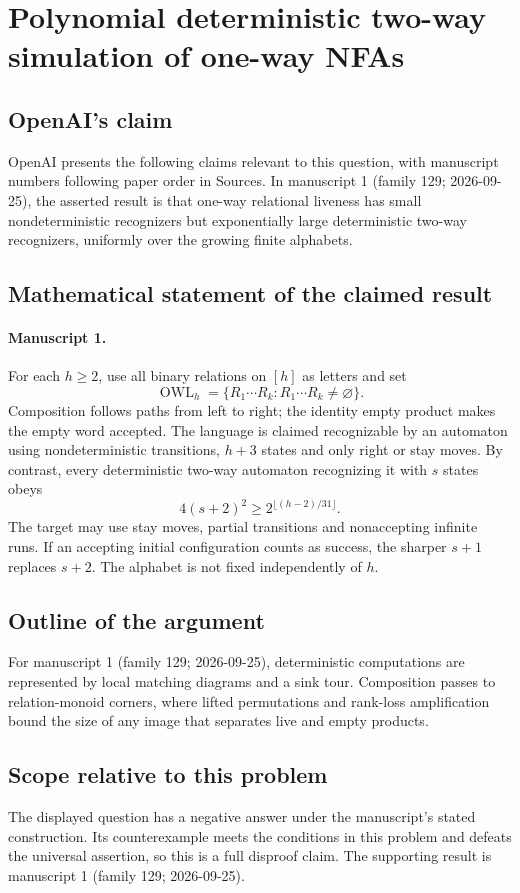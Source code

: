 \documentclass[11pt]{article}
\begin{document}
\section*{Polynomial deterministic two-way simulation of one-way NFAs}

\subsection{OpenAI's claim}
OpenAI presents the following claims relevant to this question, with manuscript numbers following paper order in Sources. In manuscript 1 (family 129; 2026-09-25), the asserted result is that one-way relational liveness has small nondeterministic recognizers but exponentially large deterministic two-way recognizers, uniformly over the growing finite alphabets.

\subsection{Mathematical statement of the claimed result}
\paragraph{Manuscript 1.}
For each $h\ge2$, use all binary relations on $[h]$ as letters and set
\[
 \operatorname{OWL}_h=\{R_1\cdots R_k:R_1\cdots R_k\ne\varnothing\}.
\]
Composition follows paths from left to right; the identity empty product makes the empty word accepted. The language is claimed recognizable by an automaton using nondeterministic transitions, $h+3$ states and only right or stay moves. By contrast, every deterministic two-way automaton recognizing it with $s$ states obeys
\[
 4(s+2)^2\ge2^{\lfloor(h-2)/31\rfloor}.
\]
The target may use stay moves, partial transitions and nonaccepting infinite runs. If an accepting initial configuration counts as success, the sharper $s+1$ replaces $s+2$. The alphabet is not fixed independently of $h$.

\subsection{Outline of the argument}
For manuscript 1 (family 129; 2026-09-25), deterministic computations are represented by local matching diagrams and a sink tour. Composition passes to relation-monoid corners, where lifted permutations and rank-loss amplification bound the size of any image that separates live and empty products.

\subsection{Scope relative to this problem}
The displayed question has a negative answer under the manuscript's stated construction. Its counterexample meets the conditions in this problem and defeats the universal assertion, so this is a full disproof claim. The supporting result is manuscript 1 (family 129; 2026-09-25).
\end{document}

